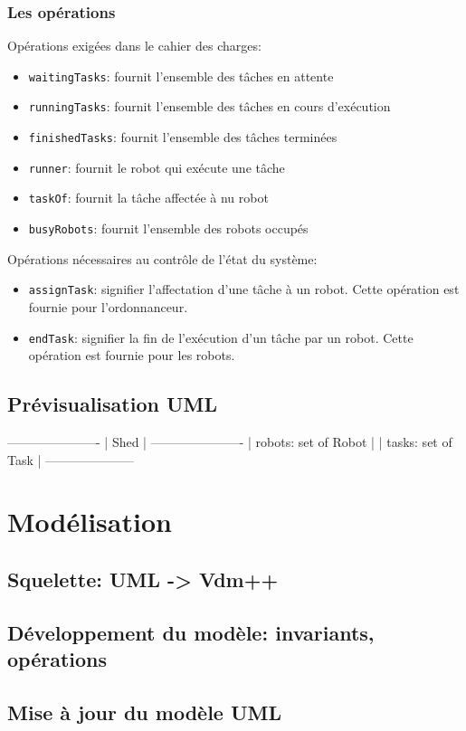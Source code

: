 \documentclass{article}
\begin{document}
\subsubsection{Les opérations}
Opérations exigées dans le cahier des charges:
\begin{itemize}
\item \texttt{waitingTasks}: fournit l'ensemble des tâches en attente
\item \texttt{runningTasks}: fournit l'ensemble des tâches en cours d'exécution
\item \texttt{finishedTasks}: fournit l'ensemble des tâches terminées
\item \texttt{runner}: fournit le robot qui exécute une tâche
\item \texttt{taskOf}: fournit la tâche affectée à nu robot
\item \texttt{busyRobots}: fournit l'ensemble des robots occupés
\end{itemize}
Opérations nécessaires au contrôle de l'état du système:
\begin{itemize}
\item \texttt{assignTask}: signifier l'affectation d'une tâche à un robot. Cette opération est fournie pour l'ordonnanceur.
\item \texttt{endTask}: signifier la fin de l'exécution d'un tâche par un robot. Cette opération est fournie pour les robots.
\end{itemize}

\subsection{Prévisualisation UML}
 ----------------------
| Shed                 |
 ----------------------
| robots: set of Robot |
| tasks: set of Task   |
 --------------------- 

\section{Modélisation}
\subsection{Squelette: UML -> Vdm++}
\subsection{Développement du modèle: invariants, opérations}
\subsection{Mise à jour du modèle UML}
\end{document}
